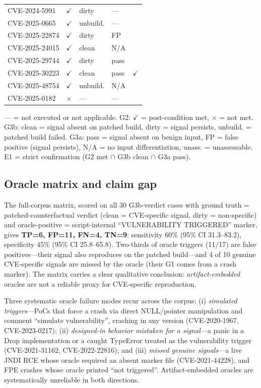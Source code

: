 \documentclass[11pt]{article}
\begin{document}
\begin{table}[H]
\begin{tabular}{@{}lllll@{}}
CVE-2024-5991 & $\checkmark$ & dirty & --- &  \\
CVE-2025-0665 & $\checkmark$ & unbuild. & --- &  \\
CVE-2025-22874 & $\checkmark$ & dirty & FP &  \\
CVE-2025-24015 & $\checkmark$ & clean & N/A &  \\
CVE-2025-29744 & $\checkmark$ & dirty & pass &  \\
CVE-2025-30223 & $\checkmark$ & clean & pass & $\checkmark$ \\
CVE-2025-48754 & $\checkmark$ & unbuild. & N/A &  \\
CVE-2025-0182 & $\times$ & --- & --- &  \\
\bottomrule\end{tabular}

\smallskip
\noindent\footnotesize --- = not executed or not applicable. G2: $\checkmark$ = post-condition met, $\times$ = not met. G3b: clean = signal absent on patched build, dirty = signal persists, unbuild. = patched build failed. G3a: pass = signal absent on benign input, FP = false positive (signal persists), N/A = no input differentiation, unass. = unassessable. E1 = strict confirmation (G2 met $\cap$ G3b clean $\cap$ G3a pass).
\normalsize
\end{table}

\subsection{Oracle matrix and claim gap}
\label{sec:oracle-matrix}
The full-corpus matrix, scored on all 30 G3b-verdict cases with ground truth = patched-counterfactual verdict (clean = CVE-specific signal, dirty = non-specific) and oracle-positive = script-internal ``VULNERABILITY TRIGGERED'' marker, gives \textbf{TP=6, FP=11, FN=4, TN=9}: sensitivity 60\% (95\% CI 31.3--83.2), specificity 45\% (95\% CI 25.8--65.8). Two-thirds of oracle triggers (11/17) are false positives---their signal also reproduces on the patched build---and 4 of 10 genuine CVE-specific signals are missed by the oracle (their G1 comes from a crash marker). The matrix carries a clear qualitative conclusion: \emph{artifact-embedded} oracles are not a reliable proxy for CVE-specific reproduction.

Three systematic oracle failure modes recur across the corpus: (i) \emph{simulated triggers}---PoCs that force a crash via direct NULL/pointer manipulation and comment ``simulate vulnerability'', crashing in any version (CVE-2020-1967, CVE-2023-0217); (ii) \emph{designed-in behavior mistaken for a signal}---a panic in a Drop implementation or a caught TypeError treated as the vulnerability trigger (CVE-2021-31162, CVE-2022-22816); and (iii) \emph{missed genuine signals}---a live JNDI RCE whose oracle required an absent marker file (CVE-2021-44228), and FPE crashes whose oracle printed ``not triggered''. Artifact-embedded oracles are systematically unreliable in both directions.
\end{document}
